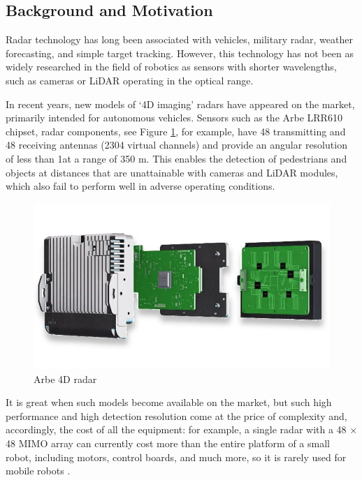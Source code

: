 \subsection{Background and Motivation}

Radar technology has long been associated with vehicles, military radar, weather forecasting, and simple target tracking. However, this technology has not been as widely researched in the field of robotics as sensors with shorter wavelengths, such as cameras or LiDAR operating in the optical range.

In recent years, new models of ‘4D imaging’ radars have appeared on the market, primarily intended for autonomous vehicles. Sensors such as the Arbe LRR610 chipset, radar components, see Figure \ref{fig:Arbe-4D-radar}, for example, have 48 transmitting and 48 receiving antennas (2304 virtual channels) and provide an angular resolution of less than 1\degree at a range of 350 m. This enables the detection of pedestrians and objects at distances that are unattainable with cameras and LiDAR modules, which also fail to perform well in adverse operating conditions\citep{arbe_radar_processor, idtechex_automotive_radar}.

\begin{figure}[H]
    \centering
    \includegraphics[width=0.75\linewidth]{Src/images/Arbe 4D radar.jpg}
    \caption{Arbe 4D radar}
    \label{fig:Arbe-4D-radar}
\end{figure}

It is great when such models become available on the market, but such high performance and high detection resolution come at the price of complexity and, accordingly, the cost of all the equipment: for example, a single radar with a 48 × 48 MIMO array can currently cost more than the entire platform of a small robot, including motors, control boards, and much more, so it is rarely used for mobile robots \citep{arbe_radar_processor}.

